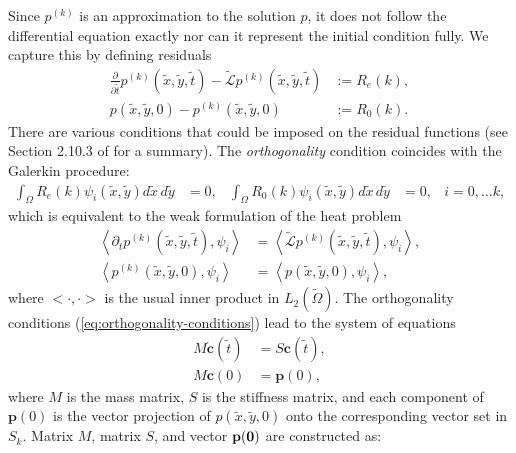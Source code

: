 Since $p^{(k)}$ is an approximation to the solution $p$, it
does not follow the differential equation exactly nor can it represent
the initial condition fully. We capture this by defining residuals
\begin{align*}
  \frac{\partial}{\partial \tilde{t}} p^{(k)}(\tilde{x},\tilde{y},\tilde{t}) - \tilde{\mathcal{L}}p^{(k)}(\tilde{x},\tilde{y},\tilde{t}) &:= R_e(k), \\
  p(\tilde{x},\tilde{y},0) - p^{(k)}(\tilde{x},\tilde{y},0) &:= R_0(k).
\end{align*}
There are various conditions that could be imposed on the residual
functions (see Section 2.10.3 of \cite{norrie1973finite} for a
summary). The \textit{orthogonality} condition coincides with the
Galerkin procedure:
\begin{align}
  \displaystyle \int_{\Omega} R_e(k) \psi_i(\tilde{x},\tilde{y}) d\tilde{x}\,d\tilde{y} &= 0,& \displaystyle \int_{\Omega} R_0(k) \psi_i(\tilde{x},\tilde{y}) d\tilde{x}\,d\tilde{y} &= 0,& i = 0,\ldots k, \label{eq:orthogonality-conditions}
\end{align}
which is equivalent to the weak formulation of the heat problem
\begin{align*}
  \left< \partial_t p^{(k)}(\tilde{x},\tilde{y},\tilde{t}), \psi_i \right> &= \left<\tilde{\mathcal{L}}p^{(k)}(\tilde{x},\tilde{y},\tilde{t}), \psi_i \right>, \\
  \left< p^{(k)}(\tilde{x},\tilde{y},0), \psi_i \right> &= \left<p(\tilde{x},\tilde{y},0), \psi_i\right>,
\end{align*}
where $<\cdot, \cdot>$ is the usual inner product in
$L_2(\tilde{\Omega})$. The orthogonality conditions
(\ref{eq:orthogonality-conditions}) lead to the system of equations
\begin{align}
  M \mathbf{\dot{c}}(\tilde{t}) &= S \mathbf{c}(\tilde{t}), \label{eq:orthogonality-conditions-mat-1}\\
  M \mathbf{c}(0) &= \mathbf{p}(0), \label{eq:orthogonality-conditions-mat-2}
\end{align}
where $M$ is the mass matrix, $S$ is the stiffness matrix, and each
component of $\mathbf{p}(0)$ is the vector projection of
$p(\tilde{x},\tilde{y},0)$ onto the corresponding vector set in
$S_k$. Matrix $M$, matrix $S$, and vector $\bf{p}(0)$ are constructed as:

